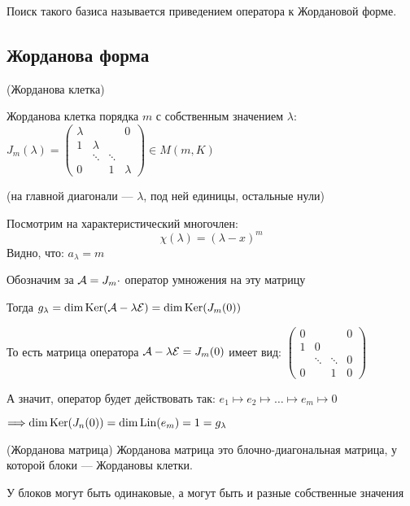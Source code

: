 Поиск такого базиса называется приведением оператора к Жордановой форме.

\subsection{Жорданова форма}

\begin{conj}(Жорданова клетка)

    Жорданова клетка порядка $ m $ с собственным значением $ \lambda $: \\
    $ J_m(\lambda) = \left(\begin{array}{cccc}
    \lambda &  &  & 0 \\ 
    1 & \lambda &  &  \\ 
     & \ddots & \ddots &  \\ 
    0 &  & 1 & \lambda
    \end{array}\right) \in M(m, K) $
    
    (на главной диагонали --- $\lambda$, под ней единицы, остальные нули)
\end{conj}

\vspace*{3mm}
Посмотрим на характеристический многочлен:
    \[  \chi(\lambda) = (\lambda - x)^m \]
Видно, что: $ a_{\lambda} = m $

Обозначим за $\mathcal{A} = J_m \cdot$ оператор умножения на эту матрицу

Тогда $ g_{\lambda} = \dim \operatorname{Ker}(\mathcal{A} - \lambda\mathcal{E}) = \dim \operatorname{Ker}(J_{m}(0))$

То есть матрица оператора $\mathcal{A} - \lambda\mathcal{E} = J_{m} (0)$ имеет вид:
$ \left(\begin{array}{cccc}
0 &  &  & 0 \\
1 & 0 &  &  \\
 & \ddots & \ddots & 0 \\ 
0 &  & 1 & 0
\end{array}\right) $

А значит, оператор будет действовать так: $e_1 \mapsto e_2 \mapsto \dots \mapsto e_m \mapsto 0$

$\Longrightarrow \dim \operatorname{Ker}(J_{n}(0)) = \dim \operatorname{Lin} (e_m) = 1 = g_{\lambda}$

\begin{conj}(Жорданова матрица)
    Жорданова матрица это блочно-диагональная матрица, у которой блоки --- Жордановы клетки.

    У блоков могут быть одинаковые, а могут быть и разные собственные значения
\end{conj}

